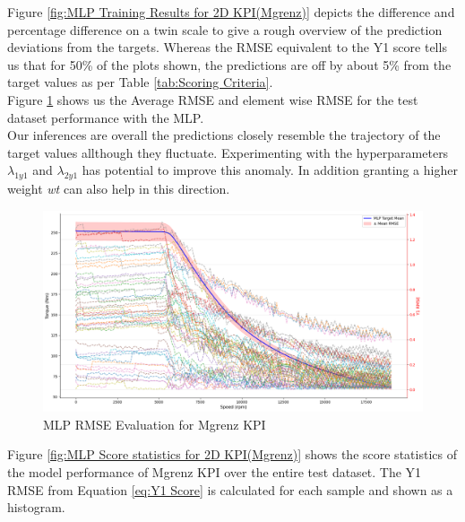 \documentclass{report} %
\begin{document}
Figure \ref{fig:MLP Training Results for 2D KPI(Mgrenz)} depicts the difference and percentage difference on a twin scale to give a rough overview of the prediction deviations from the targets.
Whereas the \ac{RMSE} equivalent to the Y1 score tells us that for 50\% of the plots shown, the predictions are off by about 5\% from the target values as per Table \ref{tab:Scoring Criteria}.\\
Figure \ref{fig:MLP RMSE Evaluation for 2D KPI(Mgrenz)} shows us the Average \ac{RMSE} and element wise \ac{RMSE} for the test dataset performance with the \ac{MLP}. \\
Our inferences are overall the predictions closely resemble the trajectory of the target values allthough they fluctuate.
Experimenting with the hyperparameters \textit{$\lambda_{1y1}$} and \textit{$\lambda_{2y1}$} has potential to improve this anomaly. 
In addition granting a higher weight \textit{wt} can also help in this direction.\\
\begin{figure}[H]
    \centering
    \includegraphics[width=1\textwidth]{./ReportImages/RMSE_MLP_y1.png} 
    \caption{\ac{MLP} \ac{RMSE} Evaluation for Mgrenz \ac{KPI}} 
    \label{fig:MLP RMSE Evaluation for 2D KPI(Mgrenz)}
\end{figure}


Figure \ref{fig:MLP Score statistics for 2D KPI(Mgrenz)} shows the score statistics of the model performance of Mgrenz \ac{KPI} over the entire test dataset.
The Y1 \ac{RMSE} from Equation \ref{eq:Y1 Score} is calculated for each sample and shown as a histogram.\\
\end{document}
